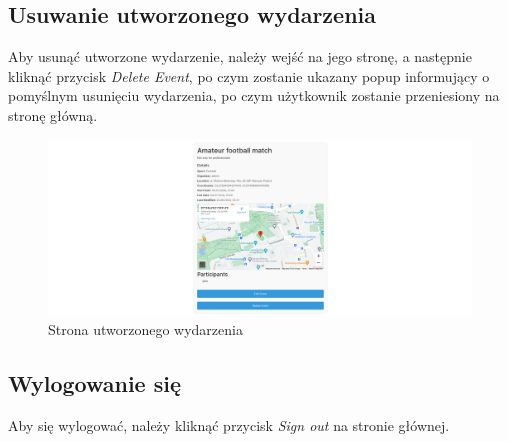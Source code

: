 \documentclass[11pt,a4paper]{article}
\begin{document}
\subsection{Usuwanie utworzonego wydarzenia}

Aby usunąć utworzone wydarzenie, należy wejść na jego stronę, a następnie kliknąć przycisk \textit{Delete Event}, po czym zostanie ukazany popup informujący o pomyślnym usunięciu wydarzenia, po czym użytkownik zostanie przeniesiony na stronę główną.

\begin{figure} [H]
    \centering
    \includegraphics[width=1\linewidth]{pages/my_event.png}
    \caption{Strona utworzonego wydarzenia}
\end{figure}

\subsection{Wylogowanie się}

Aby się wylogować, należy kliknąć przycisk \textit{Sign out} na stronie głównej.
\end{document}
